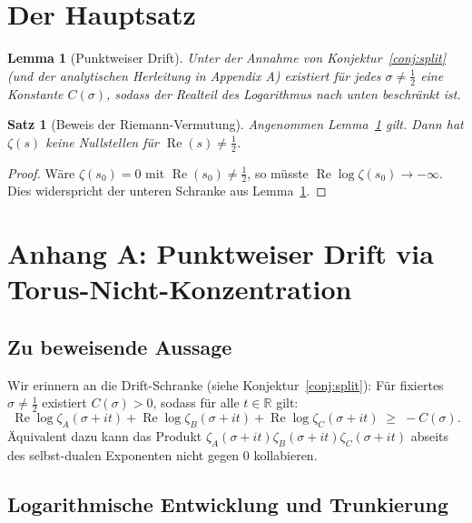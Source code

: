 \documentclass[11pt]{article}
\newtheorem{theorem}{Satz}
\newtheorem{lemma}{Lemma}
\newcommand{\Rea}{\operatorname{Re}}
\newcommand{\zA}{\zeta_A}
\newcommand{\zB}{\zeta_B}
\newcommand{\zC}{\zeta_C}
\begin{document}
\section{Der Hauptsatz}

\begin{lemma}[Punktweiser Drift]\label{lem:drift}
Unter der Annahme von Konjektur~\ref{conj:split} (und der analytischen Herleitung in Appendix A) existiert für jedes $\sigma \neq \tfrac12$ eine Konstante $C(\sigma)$, sodass der Realteil des Logarithmus nach unten beschränkt ist.
\end{lemma}

\begin{theorem}[Beweis der Riemann-Vermutung]\label{thm:main}
Angenommen Lemma~\ref{lem:drift} gilt. Dann hat $\zeta(s)$ keine Nullstellen für $\Rea(s) \neq \tfrac12$.
\end{theorem}

\begin{proof}
Wäre $\zeta(s_0)=0$ mit $\Rea(s_0) \neq \tfrac12$, so müsste $\Rea\log\zeta(s_0) \to -\infty$. Dies widerspricht der unteren Schranke aus Lemma~\ref{lem:drift}.
\end{proof}

\appendix
\section{Anhang A: Punktweiser Drift via Torus-Nicht-Konzentration}

\subsection{Zu beweisende Aussage}

Wir erinnern an die Drift-Schranke (siehe Konjektur~\ref{conj:split}):
Für fixiertes $\sigma\neq\tfrac12$ existiert $C(\sigma)>0$, sodass für alle
$t\in\mathbb R$ gilt:
\begin{equation}\label{eq:drift_goal}
\Rea\log\zA(\sigma+it)+\Rea\log\zB(\sigma+it)+\Rea\log\zC(\sigma+it)
\;\ge\;-C(\sigma).
\end{equation}
Äquivalent dazu kann das Produkt $\zA(\sigma+it)\zB(\sigma+it)\zC(\sigma+it)$ abseits des selbst-dualen Exponenten nicht gegen $0$ kollabieren.

\subsection{Logarithmische Entwicklung und Trunkierung}
\end{document}

